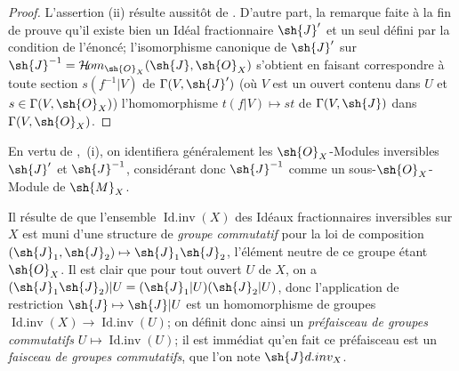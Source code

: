 \begin{proof}
L'assertion (ii) résulte aussitôt de .
D'autre part, la remarque faite à la fin de  prouve qu'il existe bien un Idéal fractionnaire $\sh{J}'$ et un seul défini par la condition de l'énoncé;
l'isomorphisme canonique de $\sh{J}'$ sur $\sh{J}^{-1}=\shHom_{\sh{O}_X}(\sh{J},\sh{O}_X)$ s'obtient en faisant correspondre à toute section $s(f^{-1}|V)$ de $\Gamma(V,\sh{J}')$ (où $V$ est un ouvert contenu dans $U$ et $s\in\Gamma(V,\sh{O}_X)$) l'homomorphisme $t(f|V)\mapsto st$ de $\Gamma(V,\sh{J})$ dans $\Gamma(V,\sh{O}_X)$.
\end{proof}

En vertu de ,~(i), on identifiera généralement les $\sh{O}_X$-Modules inversibles $\sh{J}'$ et $\sh{J}^{-1}$, considérant donc $\sh{J}^{-1}$ comme un sous-$\sh{O}_X$-Module de $\sh{M}_X$.

\begin{env}[21.2.4]
\label{IV.21.2.4}
Il résulte de  que l'ensemble $\operatorname{Id.inv}(X)$ des Idéaux fractionnaires inversibles sur $X$ est muni d'une structure de \emph{groupe commutatif} pour la loi de composition $(\sh{J}_1,\sh{J}_2)\mapsto\sh{J}_1\sh{J}_2$, l'élément neutre de ce groupe étant $\sh{O}_X$.
Il est clair que pour tout ouvert $U$ de $X$, on a $(\sh{J}_1\sh{J}_2)|U=(\sh{J}_1|U)(\sh{J}_2|U)$, donc l'application de restriction $\sh{J}\mapsto\sh{J}|U$ est un homomorphisme de groupes $\operatorname{Id.inv}(X)\to\operatorname{Id.inv}(U)$;
on définit donc ainsi un \emph{préfaisceau de groupes commutatifs} $U\mapsto\operatorname{Id.inv}(U)$;
il est immédiat qu'en fait ce préfaisceau est un \emph{faisceau de groupes commutatifs}, que l'on note $\sh{J}d.inv_X$.
\end{env}

